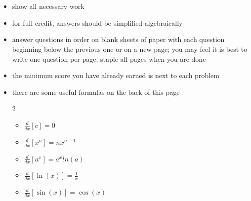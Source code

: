 
\begin{center}
    {\LARGE\textbf{\coursename}}\\[0.5em]
    {\Large\textbf{\examname}}\\[0.5em]
    {\large \examdate}
\end{center}

\vspace{2em}

\begin{itemize}

    \item show all necessary work

    \item for full credit, answers should be simplified algebraically

    \item answer questions in order on blank sheets of paper with each question beginning below the previous one or on a new page; you may feel it is best to write one question per page; staple all pages when you are done

    \item the minimum score you have already earned is next to each problem

    \item there are some useful formulas on the back of this page

    \pagebreak

    \begin{multicols}{2}

        \begin{itemize}[itemsep=1em]
            
            \item $\displaystyle \frac d {dx} \left[ c \right] = 0$
            
            \item $\displaystyle \frac d {dx} \left[ x^n \right] = nx^{n-1}$
            
            \item $\displaystyle \frac d {dx} \left[ a^x \right] = a^x ln (a)$
            
            \item $\displaystyle \frac d {dx} \left[ \ln (x) \right] = \frac 1 x$
            
            \item $\displaystyle \frac d {dx} \left[ \sin(x) \right] = \cos(x)$
            

\end{itemize}
\end{multicols}
\end{itemize}
